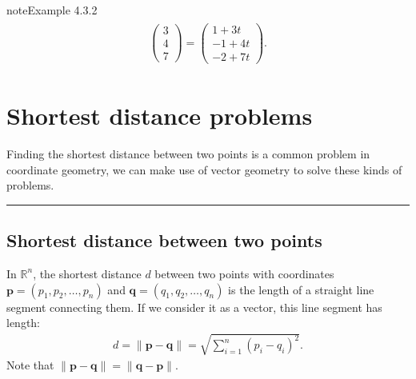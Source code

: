 \documentclass[letterpaper,10pt,english]{jupyterBook}
\begin{document}
\begin{sphinxadmonition}{note}{Example 4.3.2}
\begin{equation*}
\begin{split}
\begin{align*}
    \begin{pmatrix} 3 \\ 4 \\ 7 \end{pmatrix} =
    \begin{pmatrix} 1 + 3t \\ -1 + 4t \\ -2 + 7t \end{pmatrix}.
\end{align*} \end{split}
\end{equation*}\end{sphinxadmonition}

\sphinxstepscope


\section{Shortest distance problems}
\label{\detokenize{_pages/4.3_Shortest_distance_problems:shortest-distance-problems}}\label{\detokenize{_pages/4.3_Shortest_distance_problems::doc}}
\ignorespaces {}\label{\detokenize{_pages/4.3_Shortest_distance_problems:id1}}
\sphinxAtStartPar
Finding the shortest distance between two points is a common problem in coordinate geometry, we can make use of vector geometry to solve these kinds of problems.


\bigskip\hrule\bigskip


\ignorespaces 

\subsection{Shortest distance between two points}
\label{\detokenize{_pages/4.3_Shortest_distance_problems:index-1}}\label{\detokenize{_pages/4.3_Shortest_distance_problems:shortest-distance-between-two-points}}\label{\detokenize{_pages/4.3_Shortest_distance_problems:id2}}
\sphinxAtStartPar
In \(\mathbb{R}^n\), the shortest distance \(d\) between two points with coordinates \(\mathbf{p}=(p_1, p_2, \ldots, p_n)\) and \(\mathbf{q} = (q_1, q_2, \ldots, q_n)\) is the length of a straight line segment connecting them. If we consider it as a vector, this line segment has length:
\begin{equation*}
\begin{split} d = \|\mathbf{p} - \mathbf{q}\| = \sqrt{\displaystyle\sum_{i=1}^n (p_i-q_i)^2}. \end{split}
\end{equation*}
\sphinxAtStartPar
Note that \(\|\mathbf{p} - \mathbf{q}\| = \|\mathbf{q} - \mathbf{p}\|\).
\end{document}
